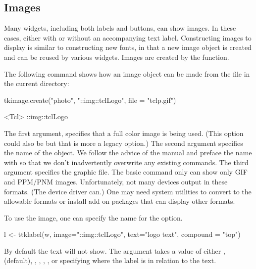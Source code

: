 \subsection{Images}
\label{sec:tcltk:overview:images}


Many  widgets, including both labels and buttons, can show
images. In these cases, either with or without an accompanying text
label. Constructing images to display is similar to constructing new
fonts, in that a new image object is created and can be reused by
various widgets. Images are created by the 
function. 

The following command shows how an image object can be made from the
file  in the current directory:

\begin{Schunk}
\begin{Sinput}
 tkimage.create("photo", "::img::tclLogo", file = "tclp.gif")
\end{Sinput}
\begin{Soutput}
<Tcl> ::img::tclLogo 
\end{Soutput}
\end{Schunk}


The first argument,  specifies that a full color image is
being used. (This option could also be  but that is more
a legacy option.) The second argument specifies the name of the
object. We follow the advice of the \TK\/ manual and preface the name
with  so that we don't inadvertently overwrite any
existing \TCL\/ commands. The third argument
 specifies the graphic file. The basic
\TK\/  command only can show only GIF and PPM/PNM
images. Unfortunately, not many \R\/ devices output in these
formats. (The  device driver can.) One may need system
utilities to convert to the allowable formats or install add-on \TCL\/
packages that can display other formats.

To use the image, one can specify the name for the  option.
\begin{Schunk}
\begin{Sinput}
 l <- ttklabel(w, image="::img::tclLogo", text="logo text", 
               compound = "top")
\end{Sinput}
\end{Schunk}

By default the text will not show. The 
argument takes a value of either , 
(default), , , , ,
or  specifying where the label is in relation to the
text.

